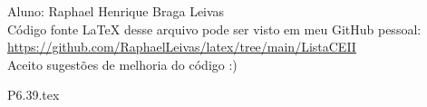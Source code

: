 \documentclass[12pt]{scrartcl}
\begin{document}
Aluno: Raphael Henrique Braga Leivas \\[20pt]
Código fonte LaTeX desse arquivo pode ser visto em meu GitHub pessoal: \\[10pt]
\href{https://github.com/RaphaelLeivas/latex/tree/main/ListaCEII}{https://github.com/RaphaelLeivas/latex/tree/main/ListaCEII} \\[20pt]
Aceito sugestões de melhoria do código :) 

{P6.39.tex}

\end{document}
